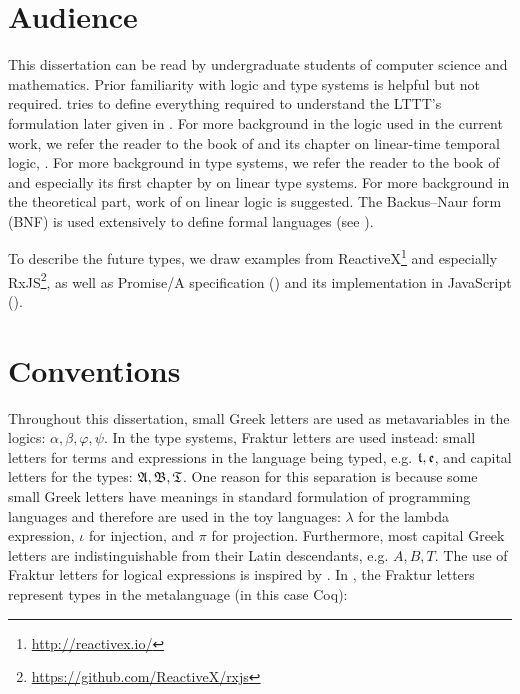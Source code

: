 \section{Audience}

This dissertation can be read by undergraduate students of computer science and mathematics.
Prior familiarity with logic and type systems is helpful but not required.  tries to define everything required to understand the LTTT's formulation later given in . For more background in the logic used in the current work, we refer the reader to the book of \cite{ben-ari2012book} and its chapter on linear-time temporal logic, \cite{Ben-Ari2012}. For more background in type systems, we refer the reader to the book of \cite{10.5555/1076265} and especially its first chapter by \cite{DavidWalker2004} on linear type systems.
For more background in the theoretical part, work of \cite{DBLP:journals/tcs/Girard87} on linear logic is suggested.
The Backus--Naur form (BNF) is used extensively to define formal languages (see \cite{DBLP:conf/ifip/Backus59}).

To describe the future types, we draw examples from ReactiveX\footnote{\url{http://reactivex.io/}} and especially RxJS\footnote{\url{https://github.com/ReactiveX/rxjs}}, as well as Promise/A specification (\cite{zyp_2010}) and its implementation in JavaScript (\cite{bershanskiy_mills_willee_ribaric_2020}).

\section{Conventions}

Throughout this dissertation, small Greek letters are used as metavariables in the logics: $\alpha, \beta, \varphi, \psi$. In the type systems, Fraktur letters are used instead: small letters for terms and expressions in the language being typed, e.g. $\mathfrak{t}, \mathfrak{e}$, and capital letters for the types: $\mathfrak{A}, \mathfrak{B}, \mathfrak{T}$. One reason for this separation is because some small Greek letters have meanings in standard formulation of programming languages and therefore are used in the toy languages: $\lambda$ for the lambda expression, $\iota$ for injection, and $\pi$ for projection. Furthermore, most capital Greek letters are indistinguishable from their Latin descendants, e.g. $A, B, T$. The use of Fraktur letters for logical expressions is inspired by \cite{hilbert1928}.
In , the Fraktur letters represent types in the metalanguage (in this case Coq):

